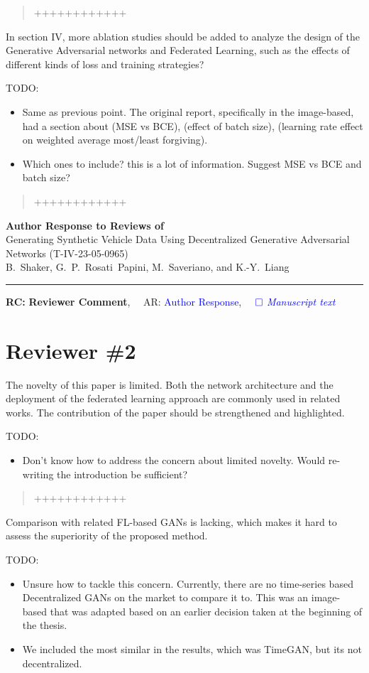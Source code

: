 \documentclass{article}
\def\papertitle{Generating Synthetic Vehicle Data Using Decentralized Generative Adversarial Networks (T-IV-23-05-0965)}
\def\authors{B.~Shaker, G.~P.~Rosati~Papini, M.~Saveriano, and K.-Y.~Liang}
\providecommand{\lettertitle}{Author Response to Reviews of}
\providecommand{\papertitle}{Title}
\providecommand{\authors}{Authors}
\providecommand{\journal}{Journal}
\providecommand{\doi}{--}
\def\headall{
{\Large\bf \lettertitle}\\[1em]
{\Large \papertitle}\\[1em]
{\authors}\\
\hrule

\hfill {\bfseries RC:} \textbf{{Reviewer Comment}},\(\quad\) AR: \textcolor{blue}{Author Response}, \(\quad\textcolor{blue}{\square}\) \emph{\textcolor{blue}{Manuscript text}}}
\begin{document}
\begin{quote}
	++++++++++++
\end{quote}

\RC In section IV, more ablation studies should be added to analyze the design of the Generative Adversarial networks and Federated Learning, such as the effects of different kinds of loss and training strategies?

\AR TODO: 
\begin{itemize}
    \item Same as previous point. The original report, specifically in the image-based, had a section about (MSE vs BCE), (effect of batch size), (learning rate effect on weighted average most/least forgiving).
    \item Which ones to include? this is a lot of information. Suggest MSE vs BCE and batch size?
\end{itemize}

\begin{quote}
	++++++++++++
\end{quote}


\newpage
\headall

\section{Reviewer \#2}

\RC The novelty of this paper is limited. Both the network architecture and the deployment of the federated learning approach are commonly used in related works. The contribution of the paper should be strengthened and highlighted.

\AR TODO: 
\begin{itemize}
    \item Don't know how to address the concern about limited novelty. Would re-writing the introduction be sufficient?
\end{itemize}

\begin{quote}
	++++++++++++
\end{quote}

\RC Comparison with related FL-based GANs is lacking, which makes it hard to assess the superiority of the proposed method.

\AR TODO: 
\begin{itemize}
    \item Unsure how to tackle this concern. Currently, there are no time-series based Decentralized GANs on the market to compare it to. This was an image-based that was adapted based on an earlier decision taken at the beginning of the thesis.
    \item We included the most similar in the results, which was TimeGAN, but its not decentralized.
\end{itemize}
\end{document}
